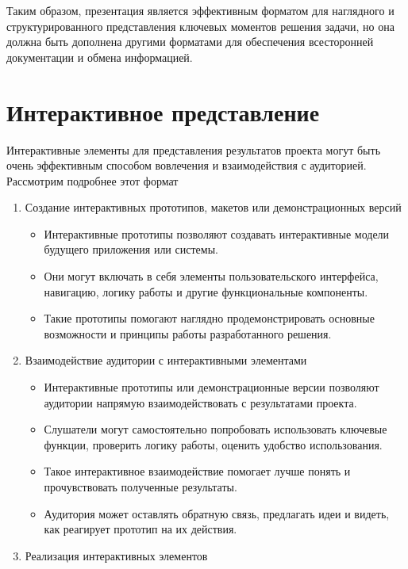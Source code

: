     Таким образом, презентация является эффективным форматом для наглядного и структурированного представления ключевых моментов решения задачи, но она должна быть дополнена другими форматами для обеспечения всесторонней документации и обмена информацией.

    \section{Интерактивное представление}
    Интерактивные элементы для представления результатов проекта могут быть очень эффективным способом вовлечения и взаимодействия с аудиторией. Рассмотрим подробнее этот формат
    \begin{enumerate}
        \item Создание интерактивных прототипов, макетов или демонстрационных версий
            \begin{itemize}
                \item Интерактивные прототипы позволяют создавать интерактивные модели будущего приложения или системы.
                \item Они могут включать в себя элементы пользовательского интерфейса, навигацию, логику работы и другие функциональные компоненты.
                \item Такие прототипы помогают наглядно продемонстрировать основные возможности и принципы работы разработанного решения.
            \end{itemize}
        \item Взаимодействие аудитории с интерактивными элементами
            \begin{itemize}
                \item Интерактивные прототипы или демонстрационные версии позволяют аудитории напрямую взаимодействовать с результатами проекта.
                \item Слушатели могут самостоятельно попробовать использовать ключевые функции, проверить логику работы, оценить удобство использования.
                \item Такое интерактивное взаимодействие помогает лучше понять и прочувствовать полученные результаты.
                \item Аудитория может оставлять обратную связь, предлагать идеи и видеть, как реагирует прототип на их действия.
            \end{itemize}
        \item Реализация интерактивных элементов
            \begin{itemize}

\end{itemize}
\end{enumerate}
